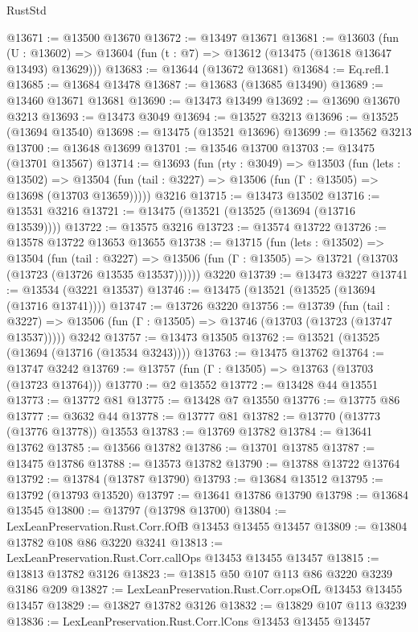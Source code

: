\begin{lexlean}{RustStd}
\begin{coremodule}
@13671 := @13500 @13670
@13672 := @13497 @13671
@13681 := @13603
    (fun (U : @13602) => @13604 (fun (t : @7) => @13612 (@13475 (@13618 @13647 @13493) @13629)))
@13683 := @13644 (@13672 @13681)
@13684 := Eq.refl.{1}
@13685 := @13684 @13478
@13687 := @13683 (@13685 @13490)
@13689 := @13460 @13671 @13681
@13690 := @13473 @13499
@13692 := @13690 @13670 @3213
@13693 := @13473 @3049
@13694 := @13527 @3213
@13696 := @13525 (@13694 @13540)
@13698 := @13475 (@13521 @13696)
@13699 := @13562 @3213
@13700 := @13648 @13699
@13701 := @13546 @13700
@13703 := @13475 (@13701 @13567)
@13714 := @13693
    (fun (rty : @3049) =>
    @13503
      (fun (lets : @13502) =>
      @13504 (fun (tail : @3227) => @13506 (fun (Γ : @13505) => @13698 (@13703 @13659)))))
    @3216
@13715 := @13473 @13502
@13716 := @13531 @3216
@13721 := @13475 (@13521 (@13525 (@13694 (@13716 @13539))))
@13722 := @13575 @3216
@13723 := @13574 @13722
@13726 := @13578 @13722 @13653 @13655
@13738 := @13715
    (fun (lets : @13502) =>
    @13504
      (fun (tail : @3227) =>
      @13506 (fun (Γ : @13505) => @13721 (@13703 (@13723 (@13726 @13535 @13537))))))
    @3220
@13739 := @13473 @3227
@13741 := @13534 (@3221 @13537)
@13746 := @13475 (@13521 (@13525 (@13694 (@13716 @13741))))
@13747 := @13726 @3220
@13756 := @13739
    (fun (tail : @3227) => @13506 (fun (Γ : @13505) => @13746 (@13703 (@13723 (@13747 @13537)))))
    @3242
@13757 := @13473 @13505
@13762 := @13521 (@13525 (@13694 (@13716 (@13534 @3243))))
@13763 := @13475 @13762
@13764 := @13747 @3242
@13769 := @13757 (fun (Γ : @13505) => @13763 (@13703 (@13723 @13764)))
@13770 := @2 @13552
@13772 := @13428 @44 @13551
@13773 := @13772 @81
@13775 := @13428 @7 @13550
@13776 := @13775 @86
@13777 := @3632 @44
@13778 := @13777 @81
@13782 := @13770 (@13773 (@13776 @13778)) @13553
@13783 := @13769 @13782
@13784 := @13641 @13762
@13785 := @13566 @13782
@13786 := @13701 @13785
@13787 := @13475 @13786
@13788 := @13573 @13782
@13790 := @13788 @13722 @13764
@13792 := @13784 (@13787 @13790)
@13793 := @13684 @13512
@13795 := @13792 (@13793 @13520)
@13797 := @13641 @13786 @13790
@13798 := @13684 @13545
@13800 := @13797 (@13798 @13700)
@13804 := LexLeanPreservation.Rust.Corr.fOfB @13453 @13455 @13457
@13809 := @13804 @13782 @108 @86 @3220 @3241
@13813 := LexLeanPreservation.Rust.Corr.callOps @13453 @13455 @13457
@13815 := @13813 @13782 @3126
@13823 := @13815 @50 @107 @113 @86 @3220 @3239 @3186 @209
@13827 := LexLeanPreservation.Rust.Corr.opsOfL @13453 @13455 @13457
@13829 := @13827 @13782 @3126
@13832 := @13829 @107 @113 @3239
@13836 := LexLeanPreservation.Rust.Corr.lCons @13453 @13455 @13457

\end{coremodule}
\end{lexlean}
